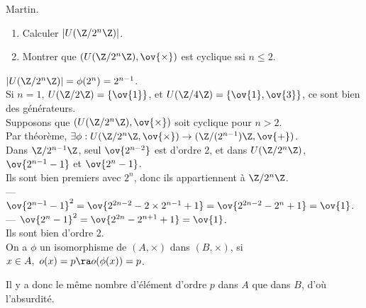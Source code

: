 \documentclass[11pt]{article}
\begin{document}
\begin{exercice}{Martin.}{}
    \begin{enumerate}
        \item Calculer $|U(\Z/2^n\Z)|$.
        \item Montrer que $(U(\Z/2^n\Z), \ov{\times})$ est cyclique ssi $n\leq2$.
    \end{enumerate}
    \tcblower
     $|U(\Z/2^n\Z)|=\phi(2^n)=2^{n-1}$.\\
     Si $n=1$, $U(\Z/2\Z)=\{\ov{1}\}$, et $U(\Z/4\Z)=\{\ov{1},\ov{3}\}$, ce sont bien des générateurs.\\
     Supposons que $(U(\Z/2^n\Z),\ov{\times})$ soit cyclique pour $n>2$.\\
    Par théorème, $\exists \phi : U(\Z/2^n\Z,\ov{\times}) \to (\Z/(2^{n-1})\Z,\ov{+})$.\\
    Dans $\Z/2^{n-1}\Z$, seul $\ov{2^{n-2}}$ est d'ordre 2, et dans $U(\Z/2^n\Z)$, $\ov{2^{n-1}-1}$ et $\ov{2^n-1}$.\\
    Ils sont bien premiers avec $2^n$, donc ils appartiennent à $\Z/2^n\Z$.\\
    --- $\ov{2^{n-1}-1}^2=\ov{2^{2n-2}-2\times2^{n-1}+1}=\ov{2^{2n-2}-2^n+1}=\ov{1}$.\\
    --- $\ov{2^n-1}^2=\ov{2^{2n}-2^{n+1}+1}=\ov{1}$.\\
    Ils sont bien d'ordre 2.\\
    On a $\phi$ un isomorphisme de $(A,\times)$ dans $(B,\times)$, si $x\in A, ~ o(x)=p \ra o(\phi(x))=p$.
    \begin{center}\end{center}
    Il y a donc le même nombre d'élément d'ordre $p$ dans $A$ que dans $B$, d'où l'absurdité.
\end{exercice}

\vspace*{-0.8cm}
\end{document}
